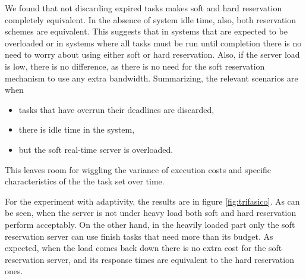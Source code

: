 \documentclass[times, 10pt,twocolumn]{article}
\begin{document}
\label{sec:simulation-results}

We found that not discarding expired tasks makes soft and hard
reservation completely equivalent. In the absence of system idle time,
also, both reservation schemes are equivalent. This suggests that in
systems that are expected to be overloaded or in systems where all
tasks must be run until completion there is no need to worry about
using either soft or hard reservation. Also, if the server load is
low, there is no difference, as there is no need for the soft
reservation mechanism to use any extra bandwidth. Summarizing, the
relevant scenarios are when
\begin{itemize}
\item tasks that have overrun their deadlines are discarded,
\item there is idle time in the system,
\item but the soft real-time server is overloaded.
\end{itemize}
This leaves room for wiggling the variance of execution costs and
specific characteristics of the the task set over time.

\begin{figure*}[t]
  \centering
  \caption{Response times for the costs in figure
    \ref{fig:costs-trifasico}.}
  \label{fig:trifasico}
\end{figure*}

For the experiment with adaptivity, the results are in figure
\ref{fig:trifasico}. As can be seen, when the server is not under
heavy load both soft and hard reservation perform acceptably. On the
other hand, in the heavily loaded part only the soft reservation
server can use finish tasks that need more than its budget. As
expected, when the load comes back down there is no extra cost for the
soft reservation server, and its response times are equivalent to the
hard reservation ones.

\begin{figure*}[t]
  \centering
  \caption{Response times for the high variance case.}
  \label{fig:variance}
\end{figure*}
\end{document}
